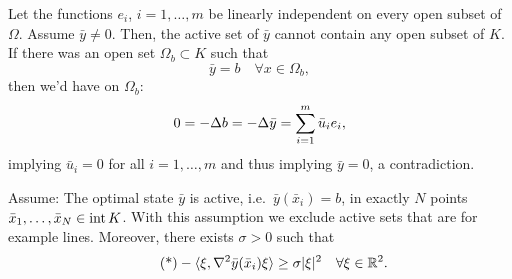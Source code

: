 \documentclass[../skript.tex]{subfiles}
\begin{document}
Let the functions $e_i$, $i =1, \ldots, m$ be linearly independent on every open subset of $\Omega$.
Assume $\bar{y} \neq 0$. Then, the active set of $\bar{y}$ cannot contain any open subset of $K$. If there was an open set $\Omega_b \subset K$ such that
\[
	\bar{y} = b \quad \forall x \in \Omega_b,
\]
then we'd have on $\Omega_b$:
\[
	0 = - \Delta b = - \Delta \bar{y} = \sum_{i=1}^m \bar{u}_i e_i,
\]
implying $\bar{u}_i = 0$ for all $i = 1, \ldots, m$ and thus implying $\bar{y} = 0$, a contradiction.

Assume: The optimal state $\bar{y}$ is active, i.e.\ $\bar{y}(\bar{x}_i) = b$, in exactly $N$ points $\bar{x}_1, \ldots, \bar{x}_N \in \operatorname{int} K$. With this assumption we exclude active sets that are for example lines.
Moreover, there exists $\sigma > 0$ such that
\begin{equation}
\tag{*}
\label{eq:ActiveSetHessian}
	- \langle \xi, \nabla^2 \bar{y}(\bar{x}_i) \xi \rangle \geq \sigma |\xi|^2 \quad \forall \xi \in \mathbb{R}^2.
\end{equation}
\end{document}
